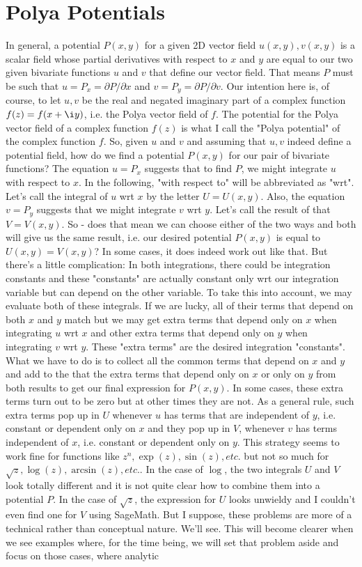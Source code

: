 \documentclass[12pt]{article}
\begin{document}
\section{Polya Potentials}
In general, a potential $P(x,y)$ for a given 2D vector field $u(x,y), v(x,y)$ is a scalar field whose partial derivatives with respect to $x$ and $y$ are equal to our two given bivariate functions $u$ and $v$ that define our vector field. That means $P$ must be such that $u = P_x = \partial P / \partial x$ and $v = P_y = \partial P / \partial v$. Our intention here is, of course, to let $u,v$ be the real and negated imaginary part of a complex function $f(z) = f(x + \i y)$, i.e. the Polya vector field of $f$. The potential for the Polya vector field of a complex function $f(z)$ is what I call the "Polya potential" of the complex function $f$. So, given $u$ and $v$ and assuming that $u,v$ indeed define a potential field, how do we find a potential $P(x,y)$ for our pair of bivariate functions? The equation $u = P_x$ suggests that to  find $P$, we might integrate $u$ with respect to $x$. In the following, "with respect to" will be abbreviated as "wrt". Let's call the integral of $u$ wrt $x$ by the letter $U = U(x,y)$. Also, the equation $v = P_y$ suggests that we might integrate $v$ wrt $y$. Let's call the result of that $V = V(x,y)$. So - does that mean we can choose either of the two ways and both will give us the same result, i.e. our desired potential $P(x,y)$ is equal to $U(x,y) = V(x,y)$? In some cases, it does indeed work out like that. But there's a little complication: In both integrations, there could be integration constants and these "constants" are actually constant only wrt our integration variable but can depend on the other variable. To take this into account, we may evaluate both of these integrals. If we are lucky, all of their terms that depend on both $x$ and $y$ match but we may get extra terms that depend only on $x$ when integrating $u$ wrt $x$ and other extra terms that depend only on $y$ when integrating $v$ wrt $y$. These "extra terms" are the desired integration "constants". What we have to do is to collect all the common terms that depend on $x$ and $y$ and add to the that the extra terms that depend only on $x$ or only on $y$ from both results to get our final expression for $P(x,y)$. In some cases, these extra terms turn out to be zero but at other times they are not. As a general rule, such extra terms pop up in $U$ whenever $u$ has terms that are independent of $y$, i.e. constant or dependent only on $x$ and they pop up in $V$, whenever $v$ has terms independent of $x$, i.e. constant or dependent only on $y$. This strategy seems to work fine for functions like $z^n, \exp(z), \sin(z), etc.$ but not so much for $\sqrt{z}, \log(z), \arcsin(z), etc.$. In the case of $\log$, the two integrals $U$ and $V$ look totally different and it is not quite clear how to combine them into a potential $P$. In the case of $\sqrt{z}$, the expression for $U$ looks unwieldy and I couldn't even find one for $V$ using SageMath. But I suppose, these problems are more of a technical rather than conceptual nature. We'll see. This will become clearer when we see examples where, for the time being, we will set that problem aside and focus on those cases, where analytic 
\end{document}
